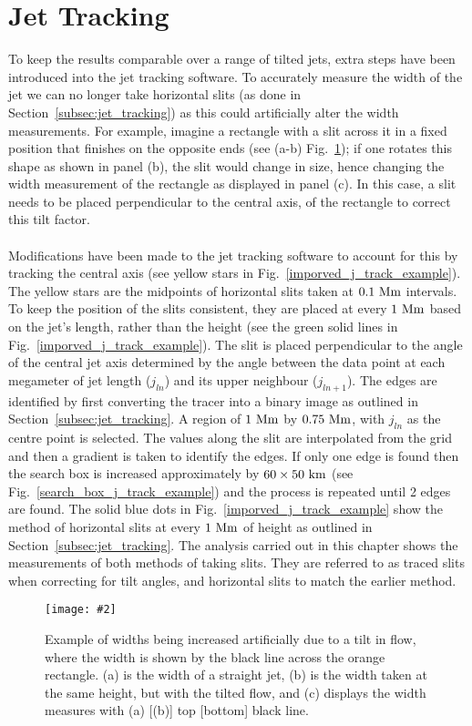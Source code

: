 \documentclass[12pt]{ociamthesis}
\newcommand{\mfig}[4]{
  \begin{figure}
  \begin{center}
  \texttt{[image: \#2]}
  \caption{#3}
  \label{#4}
  \end{center}
  \end{figure}}
\newcommand{\np}{\\ \\}
\begin{document}
\section{Jet Tracking}
\label{sec:tjt}
To keep the results comparable over a range of tilted jets, extra steps have been introduced into the jet tracking software. To accurately measure the width of the jet we can no longer take horizontal slits (as done in Section~\ref{subsec:jet_tracking}) as this could artificially alter the width measurements. For example, imagine a rectangle with a slit across it in a fixed position that finishes on the opposite ends (see (a-b) Fig.~\ref{slit_example}); if one rotates this shape as shown in panel (b), the slit would change in size, hence changing the width measurement of the rectangle as displayed in panel (c). In this case, a slit needs to be placed perpendicular to the central axis, of the rectangle to correct this tilt factor. \np
%
Modifications have been made to the jet tracking software to account for this by tracking the central axis (see yellow stars in Fig.~\ref{imporved_j_track_example}). The yellow stars are the midpoints of horizontal slits taken at $0.1~\rm{Mm}$ intervals. To keep the position of the slits consistent, they are placed at every $1~\rm{Mm}$ based on the jet's length, rather than the height (see the green solid lines in Fig.~\ref{imporved_j_track_example}). The slit is placed perpendicular to the angle of the central jet axis determined by the angle between the data point at each megameter of jet length ($j_{ln}$) and its upper neighbour ($j_{ln+1}$). The edges are identified by first converting the tracer into a binary image as outlined in Section~\ref{subsec:jet_tracking}. A region of $1~\rm{Mm}$ by $0.75~\rm{Mm}$, with $j_{ln}$ as the centre point is selected. The values along the slit are interpolated from the grid and then a gradient is taken to identify the edges. If only one edge is found then the search box is increased approximately by $60\times 50~\rm{km}$ (see Fig.~\ref{search_box_j_track_example}) and the process is repeated until 2 edges are found. The solid blue dots in  Fig.~\ref{imporved_j_track_example} show the method of horizontal slits at every $1~\rm{Mm}$ of height as outlined in Section~\ref{subsec:jet_tracking}. The analysis carried out in this chapter shows the measurements of both methods of taking slits. They are referred to as traced slits when correcting for tilt angles, and horizontal slits to match the earlier method.
\mfig{0.65}{figures/slit_size_example.png}{Example of widths being increased artificially due to a tilt in flow, where the width is shown by the black line across the orange rectangle. (a) is the width of a straight jet, (b) is the width taken at the same height, but with the tilted flow, and (c) displays the width measures with (a) [(b)] top [bottom] black line.}{slit_example}
\end{document}
